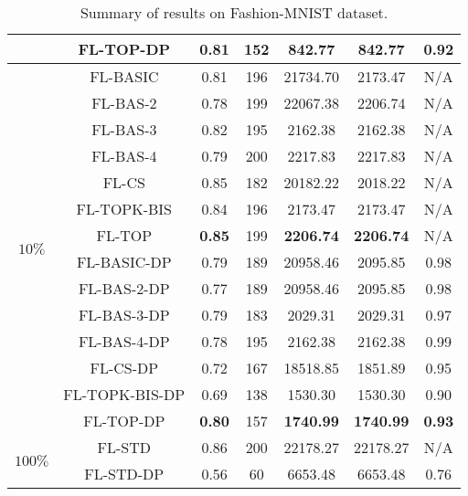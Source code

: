 \documentclass[accepted]{uai2021} %
\begin{document}
\begin{table*}[!ht]
{\begin{tabular}{|c|c|c|c|c|c|c|}
        \cline{2-7}
        &  FL-TOP-DP   &  \textbf{0.81} & 152 & \textbf{842.77}  & \textbf{842.77} & \textbf{0.92}\\
        \hline 
        \hline
        \multirow{14}{*}{$10\%$} &  FL-BASIC   &  0.81  & 196 & 21734.70 & 2173.47 &N/A  \\
        \cline{2-7}
        &  FL-BAS-2  &    0.78  & 199 & 22067.38 & 2206.74 &N/A  \\
        \cline{2-7}
        &  FL-BAS-3  &  0.82  & 195 & 2162.38 & 2162.38 & N/A  \\
        \cline{2-7}
        &  FL-BAS-4  & 0.79   & 200 & 2217.83 & 2217.83 & N/A  \\
        \cline{2-7}
        &  FL-CS  &  0.85  & 182 & 20182.22 & 2018.22 & N/A  \\
        \cline{2-7}
        &  FL-TOPK-BIS  &   0.84 & 196 & 2173.47 & 2173.47 & N/A  \\
        \cline{2-7}
        &  FL-TOP   & \textbf{0.85}  & 199 & \textbf{2206.74} & \textbf{2206.74} &N/A \\
        \cline{2-7}
        \cline{2-7}
        &  FL-BASIC-DP   &  0.79  & 189 & 20958.46 & 2095.85 & 0.98\\
        \cline{2-7}
        &  FL-BAS-2-DP  &  0.77  & 189 & 20958.46 & 2095.85 & 0.98\\
        \cline{2-7}
        &  FL-BAS-3-DP  &  0.79  & 183 & 2029.31 & 2029.31 & 0.97 \\
        \cline{2-7}
        &  FL-BAS-4-DP  & 0.78  & 195 & 2162.38 & 2162.38 & 0.99\\
        \cline{2-7}
        &  FL-CS-DP  &  0.72  & 167 & 18518.85 & 1851.89 & 0.95\\
        \cline{2-7}
        &  FL-TOPK-BIS-DP  &  0.69  & 138 & 1530.30 & 1530.30 & 0.90\\
        \cline{2-7}
        &  FL-TOP-DP   &  \textbf{0.80} & 157 & \textbf{1740.99} & \textbf{1740.99} & \textbf{0.93}\\
        \hline 
        \hline
        
        
        \multirow{2}{*}{$100\%$} &  FL-STD  &  0.86  & 200 & 22178.27 & 22178.27 & N/A  \\
        \cline{2-7}
        &  FL-STD-DP  &  0.56 & 60 & 6653.48  & 6653.48 & 0.76 \\
        \hline
        
    \end{tabular}}
    \caption{Summary of results on Fashion-MNIST dataset.}
    \label{tab:description_results_Fashion_MNIST}
\vspace{-.3cm}
\end{table*}
\end{document}
